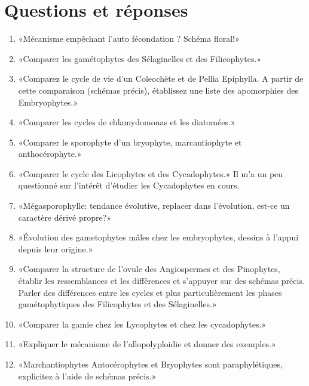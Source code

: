 \section{Questions et réponses}



\begin{enumerate}
	\item «Mécanisme empêchant l'auto fécondation ? Schéma floral!»

	\item «Comparer les gamétophytes des Sélaginelles et des Filicophytes.»

	\item «Comparez le cycle de vie d'un Coleochète et de Pellia Epiphylla. A partir de cette comparaison (schémas précis), établissez une liste des apomorphies des Embryophytes.»

	\item «Comparer les cycles de chlamydomonas et les diatomées.»

	\item «Comparer le sporophyte d'un bryophyte, marcantiophyte et anthocérophyte.»

	\item «Comparer le cycle des Licophytes et des Cycadophytes.» Il m'a un peu questionné sur l'intérêt d'étudier les Cycadophytes en cours.

	\item «Mégasporophylle: tendance évolutive, replacer dans l'évolution, est-ce un caractère dérivé propre?»

	\item «Évolution des gametophytes mâles chez les embryophytes, dessins à l'appui depuis leur origine.»

	\item «Comparer la structure de l'ovule des Angiospermes et des Pinophytes, établir les ressemblances et les différences et s'appuyer sur des schémas précis. Parler des différences entre les cycles et plus particulièrement les phases gamétophytiques des Filicophytes et des Sélaginelles.»

	\item «Comparer la gamie chez les Lycophytes et chez les cycadophytes.»

	\item «Expliquer le mécanisme de l'allopolyploidie et donner des exemples.»

	\item «Marchantiophytes Antocérophytes et Bryophytes sont paraphylétiques, explicitez à l'aide de schémas précis.»


\end{enumerate}
